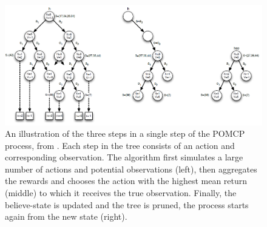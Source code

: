 \begin{figure}[ht!]
\includegraphics[width=\linewidth]{pomdp.png}
\caption{An illustration of the three steps in a single step of the POMCP process, from \cite{silver2010monte}. Each step in the tree consists of an action and corresponding observation. The algorithm first simulates a large number of actions and potential observations (left), then aggregates the rewards and chooses the action with the highest mean return (middle) to which it receives the true observation. Finally, the believe-state is updated and the tree is pruned, the process starts again from the new state (right).}
\label{fig:pomcp}
\end{figure}
